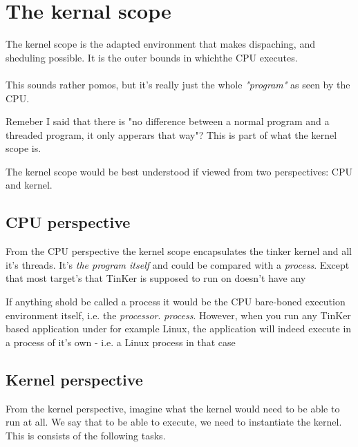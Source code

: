 \chapter{The kernal scope}
The kernel scope is the adapted environment that makes dispaching, and sheduling possible. It is the outer bounds in whichthe CPU executes.
\\\\
This sounds rather pomos, but it's really just the whole \textit{"program"} as seen by the CPU. 

Remeber I said that there is "no difference between a normal program and a threaded program, it only apperars that way"? This is part of what the kernel scope is.

The kernel scope would be best understood if viewed from two perspectives: CPU and kernel.

\section{CPU perspective}
	From the CPU perspective the kernel scope encapsulates the tinker kernel and all it's threads. It's \textit{the program itself} and could be compared with a \textit{process}. Except that most target's that TinKer is supposed to run on doesn't have any 

	If anything shold be called a process it would be the CPU bare-boned execution environment itself, i.e. the \textit{processor}. 
	\textit{process}.%
	However, when you run any TinKer based application under for example Linux, the application will indeed execute in a process of it's own - i.e. a Linux process in that case 

\section{Kernel perspective}
	From the kernel perspective, imagine what the kernel would need to be able to run at all. We say that to be able to execute, we need to instantiate the kernel. This is consists of the following tasks.

